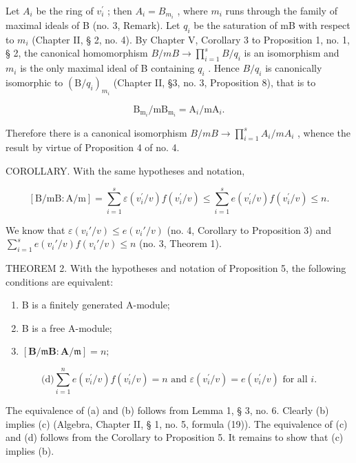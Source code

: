 Let \(A_{i}\) be the ring of \(v_{i}^{\prime}\) ; then \(A_{i} = B_{m_{i}}\) , where \(m_{i}\) runs through the family of maximal ideals of B (no. 3, Remark). Let \(q_{i}\) be the saturation of mB with respect to \(m_{i}\) (Chapter II, § 2, no. 4). By Chapter V, Corollary 3 to Proposition 1, no. 1, § 2, the canonical homomorphism \(B/mB \rightarrow \prod_{i=1}^{s} B/q_i\) is an isomorphism and \(m_i\) is the only maximal ideal of B containing \(q_i\) . Hence \(B/q_i\) is canonically isomorphic to \((\mathrm{B}/q_i)_{m_i}\) (Chapter II, §3, no. 3, Proposition 8), that is to

\[
\mathrm{B} _ {\mathrm{m} _ {i}} / \mathrm{mB} _ {\mathrm{m} _ {i}} = \mathrm{A} _ {i} / \mathrm{mA} _ {i}.
\]

Therefore there is a canonical isomorphism \(B/mB \rightarrow \prod_{i=1}^{s} A_{i}/mA_{i}\) , whence the result by virtue of Proposition 4 of no. 4.

COROLLARY. With the same hypotheses and notation,

\[
[ \mathrm{B} / \mathrm{mB}: \mathrm{A} / \mathrm{m} ] = \sum_ {i = 1} ^ {s} \varepsilon (v _ {i} ^ {\prime} / v) f (v _ {i} ^ {\prime} / v) \leqslant \sum_ {i = 1} ^ {s} e (v _ {i} ^ {\prime} / v) f (v _ {i} ^ {\prime} / v) \leqslant n.
\]

We know that \(\varepsilon(v_i'/v) \leqslant e(v_i'/v)\) (no. 4, Corollary to Proposition 3) and \(\sum_{i=1}^{s} e(v_i'/v)f(v_i'/v) \leqslant n\) (no. 3, Theorem 1).

THEOREM 2. With the hypotheses and notation of Proposition 5, the following conditions are equivalent:

\begin{enumerate}
\def\labelenumi{(\alph{enumi})}
\item
  B is a finitely generated A-module;
\item
  B is a free A-module;
\item
  \([\mathbf{B} / \mathfrak{m}\mathbf{B}\colon \mathbf{A} / \mathfrak{m}] = n;\)
\end{enumerate}

\[
\text {(d)} \sum_ {i = 1} ^ {n} e (v _ {i} ^ {\prime} / v) f (v _ {i} ^ {\prime} / v) = n \text { and } \varepsilon (v _ {i} ^ {\prime} / v) = e (v _ {i} ^ {\prime} / v) \text { for   all } i.
\]

The equivalence of (a) and (b) follows from Lemma 1, § 3, no. 6. Clearly (b) implies (c) (Algebra, Chapter II, § 1, no. 5, formula (19)). The equivalence of (c) and (d) follows from the Corollary to Proposition 5. It remains to show that (c) implies (b).

